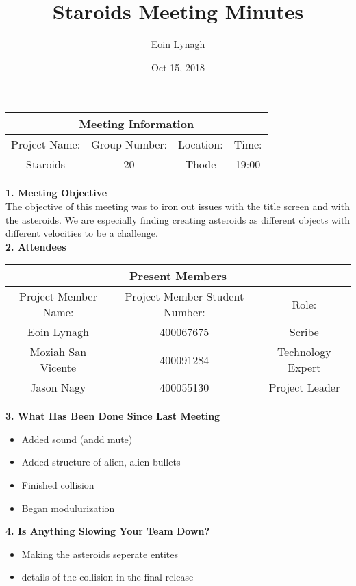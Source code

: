 \documentclass[12pt]{article}
\title{Staroids Meeting Minutes}
\author{Eoin Lynagh}
\date{Oct 15, 2018}
\begin{document}
\maketitle
\begin{center}
 \begin{tabular}{|c | c | c |  c |} 
 \hline
 \multicolumn{4}{|c|}{Meeting Information} \\
\hline
 Project Name: & Group Number: & Location: & Time: \\ 
 \hline
 Staroids & 20 & Thode & 19:00 \\
\hline
\end{tabular}
\end{center}
\begin{flushleft}


\textbf{1. Meeting Objective}\\
The objective of this meeting was to iron out issues with the title screen and with the asteroids. We are especially finding creating asteroids as different objects with different velocities to be a challenge.\\

\textbf{2. Attendees}\\
\begin{center}
 \begin{tabular}{|c | c | c | } 
 \hline
 \multicolumn{3}{|c|}{Present Members} \\
\hline
 Project Member Name: & Project Member Student Number: & Role: \\ 
 \hline\hline
 Eoin Lynagh & 400067675 & Scribe \\
\hline
Moziah San Vicente & 400091284 & Technology Expert \\
\hline
 Jason Nagy & 400055130 & Project Leader \\
\hline
\end{tabular}
\end{center}

\textbf{3. What Has Been Done Since Last Meeting}\\
\begin{itemize}
\item Added sound (andd mute)
\item Added structure of alien, alien bullets
\item Finished collision
\item Began modulurization
\end{itemize}

\textbf{4. Is Anything Slowing Your Team Down?}\\
\begin{itemize}
\item Making the asteroids seperate entites
\item details of the collision in the final release
\end{itemize}


\end{flushleft}
\end{document}
